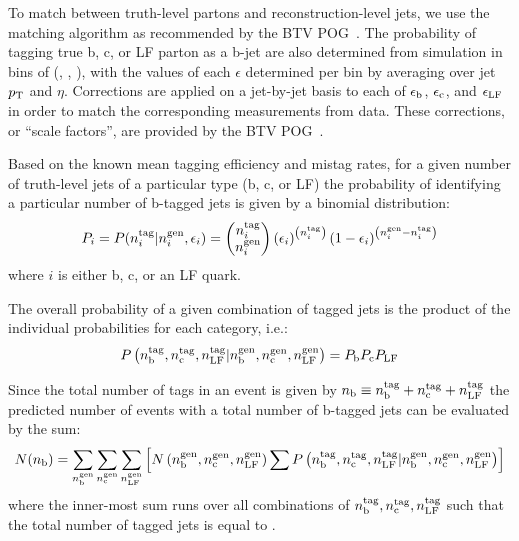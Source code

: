 To match between truth-level partons and reconstruction-level jets, we use 
the matching algorithm as recommended by the BTV POG~\cite{btagMCTools}.
The probability of tagging true b, c, or LF parton as a b-jet 
are also determined from simulation in bins of (\njet, \scalht, \mht),
with the values of each $\epsilon$ determined per bin by averaging over jet 
$p_{\rm T}$ and $\eta$. Corrections are applied on a jet-by-jet basis to
each of $\epsilon_{\rm b}$, $\epsilon_{\rm c}$, and $\epsilon_{\rm
  LF}$ in order to match the corresponding measurements from
data. These corrections, or ``scale factors'', are provided by the BTV
POG~\cite{btagMCTools}.

Based on the known mean tagging efficiency and mistag rates, for a given
number of truth-level jets of a particular type (b, c, or LF) the probability of
identifying a particular number of b-tagged jets is given by a binomial distribution:
\begin{equation}
P_i = P(n_{i}^{\rm tag}| n_{i}^{\rm gen}, \epsilon_{i}) =
     \left(\begin{matrix}n_{i}^{\rm tag} \\ n_{i}^{\rm gen}\end{matrix}\right)
     \left(\epsilon_i\right)^{\left(n_{i}^{\rm tag}\right)}
     \left(1 - \epsilon_i\right)^{\left(n_{i}^{\rm gen} - n_{i}^{\rm tag}\right)}
\end{equation}
where $i$ is either b, c, or an LF quark.

The overall probability of a given combination of tagged jets is the product of
the individual probabilities for each category, i.e.:
\begin{equation}
	P\left(n_{\rm b}^{\rm tag},  n_{\rm c}^{\rm tag}, n_{\rm LF}^{\rm tag}| 
  n_{\rm b}^{\rm gen},  n_{\rm c}^{\rm gen}, n_{\rm LF}^{\rm gen}\right) = 
	P_{\rm b} P_{\rm c} P_{\rm LF} 
\end{equation}

Since the total number of tags in an event is given by 
$n_{\text{b}} \equiv n_{\rm b}^{\rm tag} + n_{\rm c}^{\rm tag} + n_{\rm LF}^{\rm tag}$
the predicted number of events with a total number of b-tagged jets can be evaluated
by the sum:
\begin{equation}
	N(n_{\text{b}}) = \sum_{n_{\text{b}}^{\rm gen}} \sum_{n_{\rm c}^{\rm gen}} \sum_{n_{\rm LF}^{\rm gen}}
	\left[
N\left(n_{\text{b}}^{\rm gen},n_{\rm c}^{\rm gen},n_{\rm LF}^{\rm gen}\right)
\sum P\left(n_{\rm b}^{\rm tag},  n_{\rm c}^{\rm tag}, n_{\rm LF}^{\rm tag}| 
  n_{\rm b}^{\rm gen},  n_{\rm c}^{\rm gen}, n_{\rm LF}^{\rm gen}\right) 
	\right]
\end{equation}
where the inner-most sum runs over all combinations of 
$n_{\text{b}}^{\rm tag},n_{\rm c}^{\rm tag},n_{\rm LF}^{\rm tag}$
such that the total number of tagged jets is equal to \nb.

